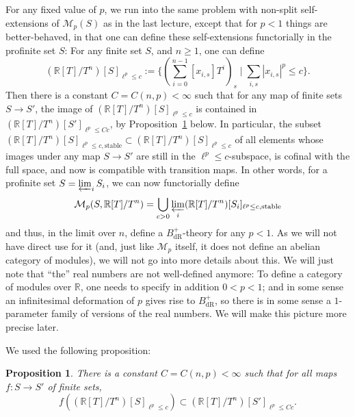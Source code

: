 \documentclass[11pt]{amsbook}
\numberwithin{equation}{section}
\numberwithin{theorem}{section}
\newtheorem{proposition}[theorem]{Proposition}
\theoremstyle{definition}
\begin{document}
For any fixed value of $p$, we run into the same problem with non-split self-extensions of $\mathcal M_p(S)$ as in the last lecture, except that for $p<1$ things are better-behaved, in that one can define these self-extensions functorially in the profinite set $S$: For any finite set $S$, and $n\geq 1$, one can define
\[
(\mathbb R[T]/T^n)[S]_{\ell^p\leq c} := \{(\sum_{i=0}^{n-1} [x_{i,s}]T^i)_s\mid \sum_{i,s} |x_{i,s}|^p\leq c\}.
\]
Then there is a constant $C=C(n,p)<\infty$ such that for any map of finite sets $S\to S'$, the image of $(\mathbb R[T]/T^n)[S]_{\ell^p\leq c}$ is contained in $(\mathbb R[T]/T^n)[S']_{\ell^p\leq Cc}$, by Proposition~\ref{prop:stableimage} below. In particular, the subset $(\mathbb R[T]/T^n)[S]_{\ell^p\leq c,\mathrm{stable}}\subset (\mathbb R[T]/T^n)[S]_{\ell^p\leq c}$ of all elements whose images under any map $S\to S'$ are still in the $\ell^p\leq c$-subspace, is cofinal with the full space, and now is compatible with transition maps. In other words, for a profinite set $S=\varprojlim_i S_i$, we can now functorially define
\[
\mathcal M_p(S,\mathbb R[T]/T^n) = \bigcup_{c>0} \varprojlim_i (\mathbb R[T]/T^n)[S_i]_{\ell^p\leq c,\mathrm{stable}}
\]
and thus, in the limit over $n$, define a $B_{\mathrm{dR}}^+$-theory for any $p<1$. As we will not have direct use for it (and, just like $\mathcal M_p$ itself, it does not define an abelian category of modules), we will not go into more details about this. We will just note that ``the'' real numbers are not well-defined anymore: To define a category of modules over $\mathbb R$, one needs to specify in addition $0<p<1$; and in some sense an infinitesimal deformation of $p$ gives rise to $B_{\mathrm{dR}}^+$, so there is in some sense a $1$-parameter family of versions of the real numbers. We will make this picture more precise later.

We used the following proposition:

\begin{proposition}\label{prop:stableimage} There is a constant $C=C(n,p)<\infty$ such that for all maps $f: S\to S'$ of finite sets,
\[
f((\mathbb R[T]/T^n)[S]_{\ell^p\leq c})\subset (\mathbb R[T]/T^n)[S']_{\ell^p\leq Cc}.
\]
\end{proposition}
\end{document}
